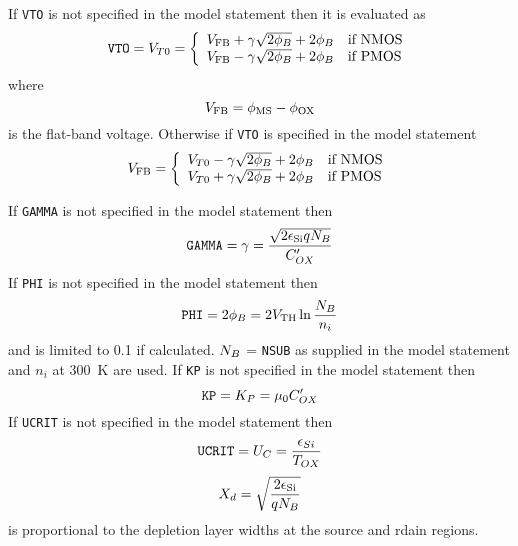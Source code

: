If {\tt VTO} is not specified in the model statement then
it is evaluated as
\begin{equation}
{\tt VTO} = \VTO = \left\{ \begin{array}{ll}
       V_{\ms{FB}} + \GAMMA \sqrt{\PHI} + \PHI & \mbox{if NMOS} \\
       V_{\ms{FB}} - \GAMMA \sqrt{\PHI} + \PHI & \mbox{if PMOS}
      \end{array} \right. %
\end{equation}
where
\begin{equation}
V_{\mbox{\scriptsize FB}} = \phi_{\mbox{\scriptsize MS}} - \phi_{\mbox{\scriptsize OX}}
\label{mFB1}
\end{equation}
is the flat-band voltage. Otherwise
if {\tt VTO} is specified in the model statement
\begin{equation}
V_{\ms{FB}} = \left\{ \begin{array}{ll}
      \VTO - \GAMMA\sqrt{\PHI} +\PHI & \mbox{if NMOS}\\
      \VTO + \GAMMA\sqrt{\PHI} +\PHI & \mbox{if PMOS} \end{array}\right. %
\label{mFB2}
\end{equation}

\noindent If {\tt GAMMA} is not specified in the model statement then
\begin{equation}
{\tt GAMMA} = \gamma = {{\sqrt{2\epsilon_{\mbox{\scriptsize Si}} q N_B}} \over {C'_{OX}}}
\label{gammaomitted}
\end{equation}
If {\tt PHI} is not specified in the model statement then
\begin{equation}
{\tt PHI} = 2\phi_B = 2 V_{\mbox{\scriptsize TH}} \ln{{N_B}\over{n_i}}
\end{equation}
and is limited to 0.1 if calculated. $N_B$ = {\tt NSUB} as supplied
in the model statement and $n_i$ at 300~K are used.
If {\tt KP} is not specified in the model statement then
\begin{equation}
{\tt KP} = K_P = \mu_0 C'_{OX}
\end{equation}
If {\tt UCRIT} is not specified in the model statement then
\begin{equation}
{\tt UCRIT} = U_C = {{\epsilon_{Si}}\over{\textstyle T_{OX}}}
\end{equation}
\begin{equation}
X_d = \sqrt{{{\textstyle2\epsilon_{\mbox{\scriptsize Si}}} \over {\textstyle q N_B}}}
\end{equation}
is proportional to the depletion layer widths at the source and rdain regions.
\vshift

